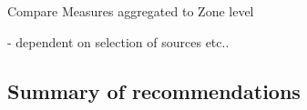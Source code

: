 Compare Measures aggregated to Zone level

- dependent on selection of sources etc..

\clearpage
 

\subsection{Summary of recommendations}



    
\clearpage     
 

 






\clearpage



\newpage



